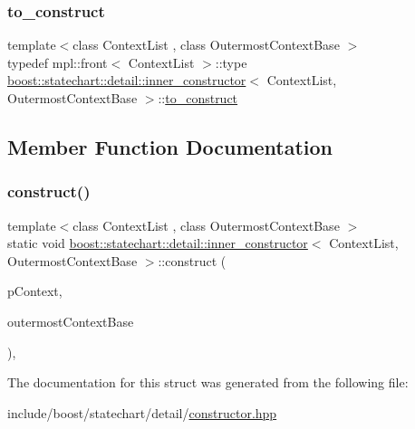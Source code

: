 \subsubsection{\texorpdfstring{to\+\_\+construct}{to\_construct}}
{\footnotesize\ttfamily template$<$class Context\+List , class Outermost\+Context\+Base $>$ \\
typedef mpl\+::front$<$ Context\+List $>$\+::type \mbox{\hyperlink{structboost_1_1statechart_1_1detail_1_1inner__constructor}{boost\+::statechart\+::detail\+::inner\+\_\+constructor}}$<$ Context\+List, Outermost\+Context\+Base $>$\+::\mbox{\hyperlink{structboost_1_1statechart_1_1detail_1_1inner__constructor_a66070519599355beff83fce685019f14}{to\+\_\+construct}}}



\subsection{Member Function Documentation}
\mbox{\label{structboost_1_1statechart_1_1detail_1_1inner__constructor_af354f3d57779d12f6f9f333105ac3578}} 
\subsubsection{\texorpdfstring{construct()}{construct()}}
{\footnotesize\ttfamily template$<$class Context\+List , class Outermost\+Context\+Base $>$ \\
static void \mbox{\hyperlink{structboost_1_1statechart_1_1detail_1_1inner__constructor}{boost\+::statechart\+::detail\+::inner\+\_\+constructor}}$<$ Context\+List, Outermost\+Context\+Base $>$\+::construct (\begin{DoxyParamCaption}\item[{const \mbox{\hyperlink{structboost_1_1statechart_1_1detail_1_1inner__constructor_ac79b48ef3b5aaf594f039305a9925aeb}{context\+\_\+ptr\+\_\+type}} \&}]{p\+Context,  }\item[{Outermost\+Context\+Base \&}]{outermost\+Context\+Base }\end{DoxyParamCaption})\hspace{0.3cm}{\ttfamily [inline]}, {\ttfamily [static]}}



The documentation for this struct was generated from the following file\+:\begin{DoxyCompactItemize}
\item 
include/boost/statechart/detail/\mbox{\hyperlink{constructor_8hpp}{constructor.\+hpp}}\end{DoxyCompactItemize}
